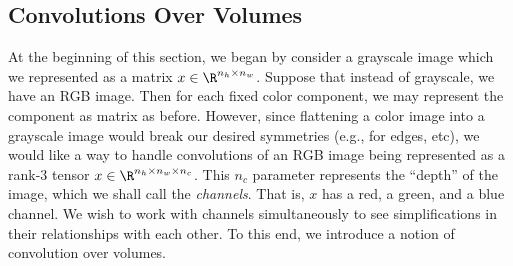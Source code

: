 \subsection{Convolutions Over Volumes}

At the beginning of this section, we began by consider a grayscale image which we represented as a matrix $x\in\R^{n_h\times n_w}$.  Suppose that instead of grayscale, we have an RGB image.  Then for each fixed color component, we may represent the component as matrix as before.  However, since flattening a color image into a grayscale image would break our desired symmetries (e.g., for edges, etc), we would like a way to handle convolutions of an RGB image being represented as a rank-$3$ tensor $x\in\R^{n_h\times n_w\times n_c}$.  This $n_c$ parameter represents the ``depth'' of the image, which we shall call the \textit{channels}.  That is, $x$ has a red, a green, and a blue channel.  We wish to work with channels simultaneously to see simplifications in their relationships with each other.  To this end, we introduce a notion of convolution over volumes.






















